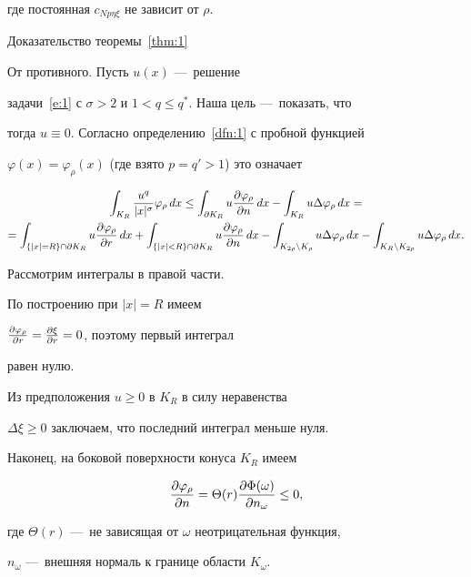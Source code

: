 где постоянная $c_{Np\eta\xi}$ не зависит от $\rho$.





\begin{pf*}{Доказательство теоремы~\ref{thm:1}}


От противного. Пусть $u(x)$ ---~решение


задачи~\eqref{e:1} с $\sigma>2$ и $1<q\le q^*$. Наша цель ---~показать, что


тогда $u\equiv0$. Согласно определению~\ref{dfn:1} с пробной функцией


$\varphi(x)=\varphi_\rho(x)$ (где взято $p=q'>1$) это означает


\begin{multline}\label{e:4}


\int_{K_R}\frac{u^q}{|x|^\sigma}\varphi_\rho\,dx\le


\int_{\p K_R}u\frac{\p\varphi_\rho}{\p n}\,dx


-\int_{K_R}u\Delta\varphi_\rho\,dx=\\


=\int_{\{|x|=R\}\cap\p K_R}u\frac{\p\varphi_\rho}{\p r}\,dx


+\int_{\{|x|<R\}\cap\p K_R}u\frac{\p\varphi_\rho}{\p n}\,dx


-\int_{K_{2\rho}\setminus K_\rho}u\Delta\varphi_\rho\,dx-


 \int_{K_R\setminus K_{2\rho}}u\Delta\varphi_\rho\,dx.


\end{multline}


Рассмотрим интегралы в правой части.


По построению при $|x|=R$ имеем


$\frac{\partial\varphi_\rho}{\partial r}=\frac{\partial\xi}{\partial r}=0$, поэтому первый интеграл


равен нулю.


Из предположения $u\ge0$ в $K_R$ в силу неравенства


$\Delta\xi\ge0$ заключаем, что последний интеграл меньше нуля.


Наконец, на боковой поверхности конуса $K_R$ имеем


$$


\frac{\p\varphi_\rho}{\p n}=\Theta(r)\frac{\p\Phi(\omega)}{\p n_\omega}\le0,


$$


где $\Theta(r)$ ---~не зависящая от $\omega$ неотрицательная функция,


$n_\omega$ ---~внешняя нормаль к границе области $K_\omega$.



\end{pf*}

